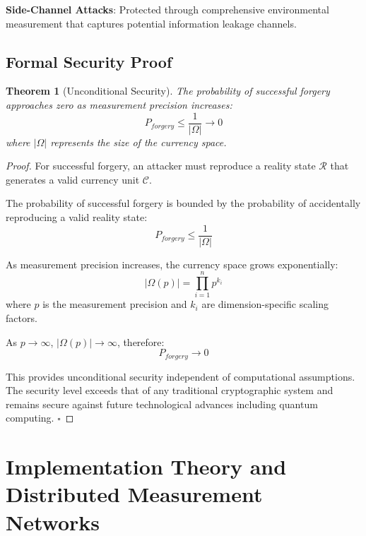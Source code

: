 \documentclass[12pt,a4paper]{article}
\newtheorem{theorem}{Theorem}
\begin{document}
\textbf{Side-Channel Attacks}: Protected through comprehensive environmental measurement that captures potential information leakage channels.

\subsection{Formal Security Proof}

\begin{theorem}[Unconditional Security]
The probability of successful forgery approaches zero as measurement precision increases:
\begin{equation}
P_{forgery} \leq \frac{1}{|\Omega|} \rightarrow 0
\end{equation}
where $|\Omega|$ represents the size of the currency space.
\end{theorem}

\begin{proof}
For successful forgery, an attacker must reproduce a reality state $\mathcal{R}$ that generates a valid currency unit $\mathcal{C}$.

The probability of successful forgery is bounded by the probability of accidentally reproducing a valid reality state:
\begin{equation}
P_{forgery} \leq \frac{1}{|\Omega|}
\end{equation}

As measurement precision increases, the currency space grows exponentially:
\begin{equation}
|\Omega(p)| = \prod_{i=1}^{n} p^{k_i}
\end{equation}
where $p$ is the measurement precision and $k_i$ are dimension-specific scaling factors.

As $p \to \infty$, $|\Omega(p)| \to \infty$, therefore:
\begin{equation}
P_{forgery} \to 0
\end{equation}

This provides unconditional security independent of computational assumptions. The security level exceeds that of any traditional cryptographic system and remains secure against future technological advances including quantum computing. $\square$
\end{proof}

\section{Implementation Theory and Distributed Measurement Networks}
\end{document}
